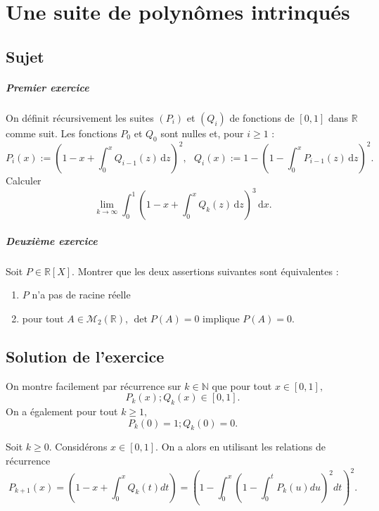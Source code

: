\chapter{Une suite de polynômes intrinqués}

\section{Sujet}

\paragraph{Premier exercice}
On définit récursivement les suites $(P_{i} )$ et $(Q_{i} )$ de fonctions de $[0, 1]$ dans $\mathbb{R}$ comme suit. Les fonctions $P_{0}$ et $Q_{0}$ sont nulles et, pour $i \geqslant 1$ : \[P_{i} (x) := \left( 1 - x + \int _{0} ^{x}  Q_{i-1} (z)\,\mathrm{d}z \right)^2 , \ \ \ Q_{i} (x) := 1 - \left(1 - \int _{0} ^{x} P_{i-1} (z)\,\mathrm{d}z\right)^2 .\]
Calculer \[\lim _{k\rightarrow \infty } \int _{0} ^{1} \left( 1 - x + \int _{0} ^{x} Q_{k} (z)\,\mathrm{d}z\right)^{3} \,\mathrm{d}x.\]

\paragraph{Deuxième exercice}
Soit $P \in  \mathbb{R}[X]$. Montrer que les deux assertions suivantes sont équivalentes :
\begin{enumerate}
	\item $P$ n'a pas de racine réelle
	\item pour tout $A \in  \mathcal{M}_{2} (\mathbb{R})$, $\det P(A) = 0$ implique $P(A) = 0$.
\end{enumerate}


\section{Solution de l'exercice}

On montre facilement par récurrence sur $k\in\mathbb{N}$ que pour tout $x\in[0,1],$ $$P_{k}(x);Q_{k}(x)\in[0,1].$$ 
On a également pour tout $k\geq 1,$ $$P_{k}(0)=1;Q_{k}(0)=0.$$

Soit $k\geq 0.$ Considérons $x\in[0,1].$ On a  alors en utilisant les relations de récurrence
$$P_{k+1}(x)=\left(1-x+\int_{0}^{x}Q_{k}(t)dt\right)=\left(1-\int_{0}^{x}\left(1-\int_{0}^{t}P_{k}(u)du\right)^{2}dt\right)^{2}.$$

